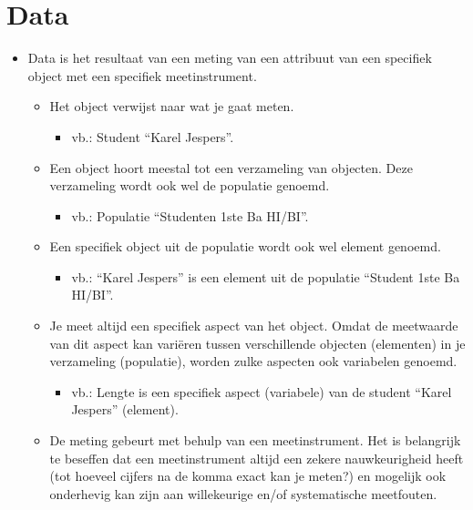 \documentclass[]{memoir}
\providecommand{\tightlist}{%
  \setlength{\itemsep}{0pt}\setlength{\parskip}{0pt}}
\begin{document}
\hypertarget{data}{%
\section{Data}\label{data}}

\begin{itemize}
\tightlist
\item
  Data is het resultaat van een meting van een attribuut van een specifiek object met een specifiek meetinstrument.

  \begin{itemize}
  \tightlist
  \item
    Het object verwijst naar wat je gaat meten.

    \begin{itemize}
    \tightlist
    \item
      vb.: Student ``Karel Jespers''.
    \end{itemize}
  \item
    Een object hoort meestal tot een verzameling van objecten. Deze verzameling wordt ook wel de populatie genoemd.

    \begin{itemize}
    \tightlist
    \item
      vb.: Populatie ``Studenten 1ste Ba HI/BI''.
    \end{itemize}
  \item
    Een specifiek object uit de populatie wordt ook wel element genoemd.

    \begin{itemize}
    \tightlist
    \item
      vb.: ``Karel Jespers'' is een element uit de populatie ``Student 1ste Ba HI/BI''.
    \end{itemize}
  \item
    Je meet altijd een specifiek aspect van het object. Omdat de meetwaarde van dit aspect kan variëren tussen verschillende objecten (elementen) in je verzameling (populatie), worden zulke aspecten ook variabelen genoemd.

    \begin{itemize}
    \tightlist
    \item
      vb.: Lengte is een specifiek aspect (variabele) van de student ``Karel Jespers'' (element).
    \end{itemize}
  \item
    De meting gebeurt met behulp van een meetinstrument. Het is belangrijk te beseffen dat een meetinstrument altijd een zekere nauwkeurigheid heeft (tot hoeveel cijfers na de komma exact kan je meten?) en mogelijk ook onderhevig kan zijn aan willekeurige en/of systematische meetfouten.


\end{itemize}
\end{itemize}
\end{document}
